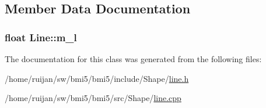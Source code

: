 \subsection{Member Data Documentation}
\hypertarget{classLine_ab7c1828bc8bc4e3647dfdd963c17d555}{
\subsubsection[{m\-\_\-l}]{\setlength{\rightskip}{0pt plus 5cm}float Line\-::m\-\_\-l\hspace{0.3cm}{\ttfamily [private]}}}\label{classLine_ab7c1828bc8bc4e3647dfdd963c17d555}


The documentation for this class was generated from the following files\-:\begin{DoxyCompactItemize}
\item 
/home/ruijan/sw/bmi5/bmi5/include/\-Shape/\hyperlink{line_8h}{line.\-h}\item 
/home/ruijan/sw/bmi5/bmi5/src/\-Shape/\hyperlink{line_8cpp}{line.\-cpp}\end{DoxyCompactItemize}
